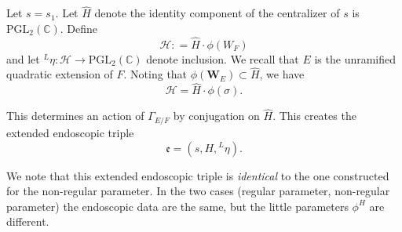 \documentclass[11pt]{amsart}
\numberwithin{equation}{section}
\def\fe{\mathfrak{e}}
\def\PGL{\mathrm{PGL}}
\def\bW{\mathbf{W}}
\def\C{\mathbb{C}}
\newcommand{\<}{\left\langle}
\renewcommand{\>}{\right\rangle}
\begin{document}
 Let $s = s_1$.   Let $\widehat{H}$ denote the identity component of the centralizer of $s$ is $\PGL_2(\C)$.   
  Define
  \[
  \mathcal{H}: = \widehat{H} \cdot \phi(W_F)
  \]
  and let ${}^L\eta : \mathcal{H} \to \PGL_2(\C)$ denote inclusion.   We recall that $E$ is the unramified quadratic extension of $F$.    Noting that $\phi(\bW_E) \subset \widehat{H}$, we have
  \[
  \mathcal{H} = \widehat{H} \cdot \phi(\sigma).
  \]
  
 
 
  This determines an action of $\Gamma_{E/F}$ by conjugation on $\widehat{H}$.    This creates the extended endoscopic triple
\[
\fe = (s, H, {}^L\eta).
\]

We note that this extended endoscopic triple is \emph{identical} to the one constructed for the non-regular parameter. In the two cases (regular parameter, non-regular parameter) the endoscopic data are the same, but the little parameters $\phi^H$ are different.   
\end{document}
